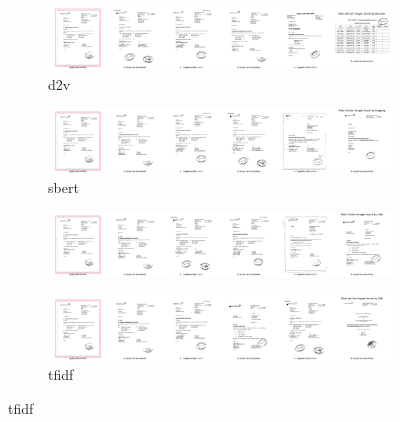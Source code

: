 \begin{figure}[h!]
    \begin{subfigure}{\textwidth}
        \centering
        \includegraphics[width=1\textwidth]{images/query_results/4b4d0a9ee0c7283e5bfd69c402c73b2140bf90351c8f44d6809afe23c6dfaa50/Most_similar_images_found_by_doc2vec.pdf}
        \caption{\ac{d2v}}
        \label{fig:query_resp_doc2vec}
    \end{subfigure}

    \begin{subfigure}{\textwidth}
        \centering
        \includegraphics[width=1\textwidth]{images/query_results/4b4d0a9ee0c7283e5bfd69c402c73b2140bf90351c8f44d6809afe23c6dfaa50/Most_similar_images_found_by_hugging.pdf}
        \caption{\ac{sbert}}
        \label{fig:query_resp_sbert}
    \end{subfigure}

    \begin{subfigure}{\textwidth}
        \centering
        \includegraphics[width=1\textwidth]{images/query_results/4b4d0a9ee0c7283e5bfd69c402c73b2140bf90351c8f44d6809afe23c6dfaa50/Most_similar_images_found_by_infer.pdf}
        \caption{\infersent{}}
        \label{fig:query_resp_infer}
    \end{subfigure}

    \begin{subfigure}{\textwidth}
        \centering
        \includegraphics[width=1\textwidth]{images/query_results/4b4d0a9ee0c7283e5bfd69c402c73b2140bf90351c8f44d6809afe23c6dfaa50/Most_similar_images_found_by_tfidf.pdf}
        \caption{\ac{tfidf}}
        \label{fig:query_resp_tfidf}
    \end{subfigure}


\end{figure}
